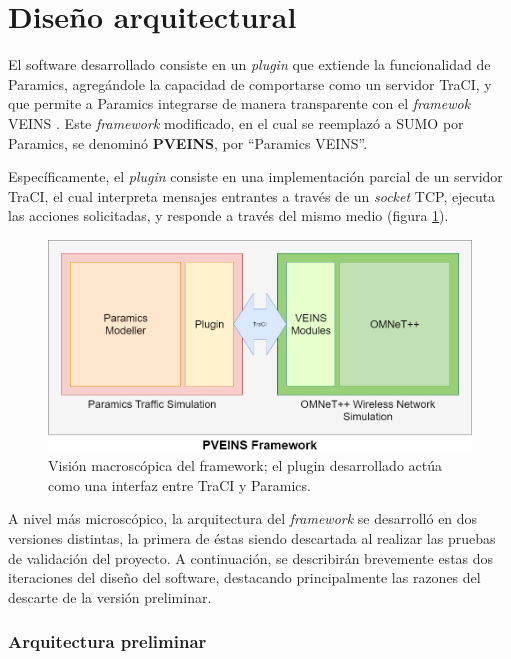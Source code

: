 \section{Diseño arquitectural}\label{sec:architecture}

El software desarrollado consiste en un \emph{plugin} que extiende la funcionalidad de Paramics, agregándole la capacidad de comportarse como un servidor TraCI, y que permite a Paramics integrarse de manera transparente con el \emph{framewok} VEINS \autocite{sommer_german_dressler}. Este \emph{framework} modificado, en el cual se reemplazó a SUMO por Paramics, se denominó \textbf{PVEINS}, por ``Paramics VEINS''. 

Específicamente, el \emph{plugin} consiste en una implementación parcial de un servidor TraCI, el cual interpreta mensajes entrantes a través de un \emph{socket} TCP, ejecuta las acciones solicitadas, y responde a través del mismo medio (figura \ref{fig:pveins_genarch}).

\begin{figure}[h]
    \centering
    \includegraphics[width=\linewidth]{figuras/PVEINSArch.png}
    \caption[Visión macroscópica del framework]{Visión macroscópica del framework; el plugin desarrollado actúa como una interfaz entre TraCI y Paramics.}
    \label{fig:pveins_genarch}
\end{figure}

A nivel más microscópico, la arquitectura del \emph{framework} se desarrolló en dos versiones distintas, la primera de éstas siendo descartada al realizar las pruebas de validación del proyecto. A continuación, se describirán brevemente estas dos iteraciones del diseño del software, destacando principalmente las razones del descarte de la versión preliminar.

\subsubsection{Arquitectura preliminar}

